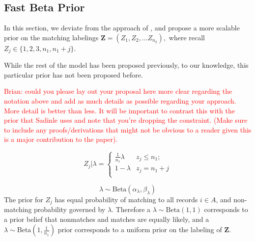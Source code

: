 \documentclass[12pt,letterpaper]{article}
\newcommand{\1}[1]{\mathbb{I}\!\left[#1\right]} %
\begin{document}
\hypertarget{fast-beta-prior}{%
	\subsection{Fast Beta Prior}
	\label{fast-beta-prior}}


In this section, we deviate from the approach of \cite{sadinle_bayesian_2017}, and propose a more scalable prior on the matching labelings $\bm{Z} = (Z_1, Z_2, \ldots Z_{n_2}),$ where recall $Z_j \in \{1,2, 3, n_1, n_1 + j\}.$ 

While the rest of the model has been proposed previously, to our knowledge, this particular prior has not been proposed before. 

\textcolor{red}{Brian: could you please lay out your proposal here more clear regarding the notation above and add as much details as possible regarding your approach. More detail is better than less. It will be important to contrast this with the prior that Sadinle uses and note that you're dropping the constraint. (Make sure to include any proofs/derivations that might not be obvious to a reader given this is a major contribution to the paper).}

\[Z_j | \lambda =
\begin{cases} 
	\frac{1}{n_1}\lambda  & z_j \leq n_1; \\
	1-\lambda &  z_j  = n_1 + j \\
\end{cases}\]

\[\lambda \sim \text{Beta}(\alpha_{\lambda}, \beta_{\lambda}) \] The
prior for \(Z_j\) has equal probability of matching to all records
\(i\in A\), and non-matching probability governed by \(\lambda\).
Therefore a \(\lambda \sim \text{Beta}(1, 1)\) corresponds to a prior
belief that nonmatches and matches are equally likely, and a
\(\lambda \sim \text{Beta}\left(1, \frac{1}{n_1}\right)\) prior
corresponds to a uniform prior on the labeling of \(\mathbf{Z}\).
\end{document}
